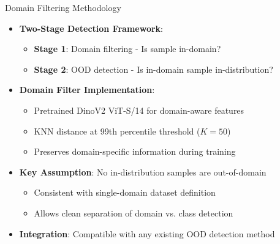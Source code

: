 \documentclass[aspectratio=169]{beamer}
\begin{document}
\begin{frame}{Domain Filtering Methodology}
\begin{itemize}
    \item \textbf{Two-Stage Detection Framework}:
    \begin{itemize}
        \item \textbf{Stage 1}: Domain filtering - Is sample in-domain?
        \item \textbf{Stage 2}: OOD detection - Is in-domain sample in-distribution?
    \end{itemize}
    \item \textbf{Domain Filter Implementation}:
    \begin{itemize}
        \item Pretrained DinoV2 ViT-S/14 for domain-aware features
        \item KNN distance at 99th percentile threshold ($K=50$)
        \item Preserves domain-specific information during training
    \end{itemize}
    \item \textbf{Key Assumption}: No in-distribution samples are out-of-domain
    \begin{itemize}
        \item Consistent with single-domain dataset definition
        \item Allows clean separation of domain vs. class detection
    \end{itemize}
    \item \textbf{Integration}: Compatible with any existing OOD detection method
\end{itemize}
\end{frame}
\end{document}
